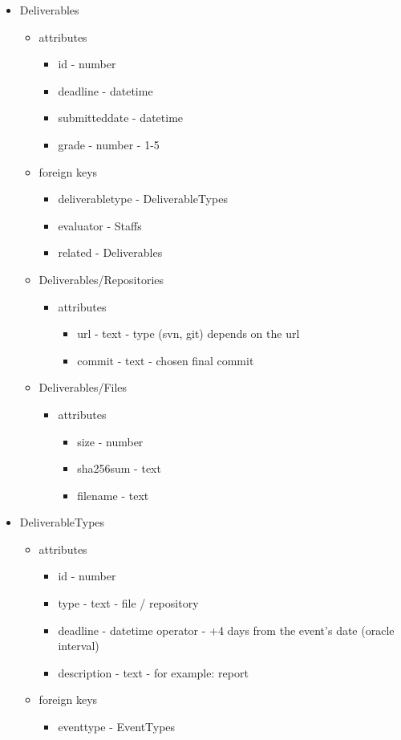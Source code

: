 \begin{itemize}
	\item Deliverables
	\begin{itemize}
		\item attributes
		\begin{itemize}
			\item id - number
			\item deadline - datetime
			\item submitteddate - datetime
			\item grade - number - 1-5
		\end{itemize}
		\item foreign keys
		\begin{itemize}
			\item deliverabletype - DeliverableTypes
			\item evaluator - Staffs
			\item related - Deliverables
		\end{itemize}
		\item Deliverables/Repositories
		\begin{itemize}
			\item attributes
			\begin{itemize}
				\item url - text - type (svn, git) depends on the url
				\item commit - text - chosen final commit
			\end{itemize}
		\end{itemize}
		\item Deliverables/Files
		\begin{itemize}
			\item attributes
			\begin{itemize}
				\item size - number
				\item sha256sum - text
				\item filename - text
			\end{itemize}
		\end{itemize}
	\end{itemize}
	
	\item DeliverableTypes
	\begin{itemize}
		\item attributes
		\begin{itemize}
			\item id - number
			\item type - text - file / repository
			\item deadline - datetime operator - +4 days from the event's date (oracle interval)
			\item description - text - for example: report
		\end{itemize}
		\item foreign keys
		\begin{itemize}
			\item eventtype - EventTypes
		\end{itemize}
	\end{itemize}
	

\end{itemize}
